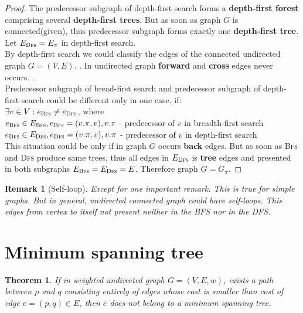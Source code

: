 \documentclass{article}
\newtheorem{theorem}{Theorem}[section]
\newtheorem*{remark}{Remark}
\begin{document}
\begin{proof}
The predecessor subgraph of depth-first search forms a \textbf{depth-first
forest} comprising several \textbf{depth-first trees}. But as soon as graph
$G$ is connected(given), thus predecessor subgraph forms exactly one \textbf{depth-first
tree}.\\

Let $E_\textsc{Dfs} = E_\pi$ in depth-first search.\\


By depth-first search we could classify the edges of the connected undirected graph $G=(V,E)$.
\cite[Classification of edges][page 609]{introtoalg}. In undirected graph
\textbf{forward} and \textbf{cross} edges never occurs. \cite[by Theorem
22.10][page 610]{introtoalg}.\\

Predecessor subgraph of bread-first search and predecessor subgraph of
depth-first search could be different only in one case, if:\\

$\exists v \in V : e_\textsc{Bfs} \neq e_\textsc{Dfs}$, where\\
$e_\textsc{Bfs} \in E_\textsc{Bfs}, e_\textsc{Bfs} = (v.\pi, v), v.\pi$ -
predecessor of $v$ in breadth-first search\\
$e_\textsc{Dfs} \in E_\textsc{Dfs}, e_\textsc{Dfs} = (v.\pi, v), v.\pi$ -
predecessor of $v$ in depth-first search\\

This situation could be only if in graph $G$ occurs \textbf{back} edges. But as
soon as \textsc{Bfs} and \textsc{Dfs} produce same trees, thus all edges in
$E_\textsc{Dfs}$ is \textbf{tree} edges and presented in both subgraphs
$E_\textsc{Bfs} = E_\textsc{Dfs} = E$.
Therefore graph $G = G_\pi$.
\end{proof}

\begin{remark}[Self-loop]
Except for one important remark. This is true for simple graphs. But in
general, undirected connected graph could have self-loops. This edges from
vertex to itself not present neither in the BFS nor in the DFS.
\end{remark}

\pagebreak
\section{Minimum spanning tree}

\begin{theorem}
  If in weighted undirected graph $G=(V, E, w)$,
  exists a path between $p$ and $q$ consisting entirely
  of edges whose cost is smaller than cost of edge $e=(p,q) \in E$, then $e$
  does not belong to a minimum spanning tree.
\end{theorem}
\end{document}
